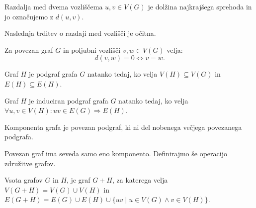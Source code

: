\documentclass[mat1, tisk]{fmfdelo}
\begin{document}
\begin{definicija} \label{def:razdalja}
    Razdalja med dvema vozliščema $u, v \in V(G)$ je dolžina najkrajšega sprehoda in jo 
    označujemo z $d(u, v).$ 
\end{definicija}

Naslednja trditev o razdaji med vozlišči je očitna.

\begin{trditev} \label{trd:nicelna_razdalja}
    Za povezan graf $G$ in poljubni vozlišči $v, w \in V(G)$ velja:
    $$ d(v, w) = 0 \Leftrightarrow v=w.$$
\end{trditev} 

\begin{definicija} \label{def:podgraf}
    Graf $H$ je podgraf grafa $G$ natanko tedaj, ko velja $V(H) \subseteq V(G)$ in 
    $E(H) \subseteq E(H)$.
\end{definicija}

\begin{definicija} \label{def:induciran_podgraf}
    Graf $H$ je induciran podgraf grafa $G$ natanko tedaj, ko velja 
    $\forall u, v \in V(H) : uv \in E(G) \Rightarrow E(H)$.
\end{definicija}

\begin{definicija} \label{def:komponenta}
Komponenta grafa je povezan podgraf, ki ni del nobenega večjega povezanega podgrafa. 
\end{definicija}

Povezan graf ima seveda samo eno komponento. Definirajmo še operacijo združitve grafov.

\begin{definicija} \label{def:vsota}
    Vsota grafov $G$ in $H$, je graf $G + H$, za katerega velja $V(G + H) = V(G) \cup V(H)$ 
    in $E(G + H)  = E(G) \cup E(H) \cup \{ uv \;  | \;  u \in V(G) \land v \in V(H) \}.$
\end{definicija}
\end{document}
